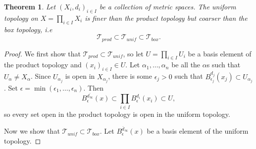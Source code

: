 \documentclass{article}
\newtheorem{theorem}{Theorem}[subsection]
\theoremstyle{definition}
\theoremstyle{remark}
\newcommand{\prt}[1]{\mathcal{#1}}
\newcommand{\ball}[3]{B_{#1}^{#3}(#2)}
\let\oldmin\min
\renewcommand{\min}[1]{\oldmin \left( #1 \right)}
\begin{document}
\begin{theorem} \label{thm_productUniformBoxCmp}
    Let $(X_i, d_i)_{i \in I}$ be a collection of metric spaces. The uniform topology on $X = \prod_{i \in I} X_i$ is finer than the product topology but coarser than the box topology, i.e
    \begin{equation*}
        \prt{T}_{prod} \subset \prt{T}_{unif} \subset \prt{T}_{box}.
    \end{equation*}
\end{theorem}

\begin{proof}
    We first show that $\prt{T}_{prod} \subset \prt{T}_{unif}$, so let $U=\prod_{i \in I} U_i$ be a basis element of the product topology and $(x_{i})_{i \in I} \in U$. Let $\alpha_1, \dots, \alpha_n$ be all the $\alpha$s such that $U_\alpha \neq X_\alpha$. Since $U_{\alpha_j}$ is open in $X_{\alpha_j}$, there is some $\epsilon_j > 0$ such that $B_{\epsilon_j}^{d_j}(x_j) \subset U_{\alpha_j}$. Set $\epsilon = \min{\epsilon_1, \dots, \epsilon_n}$. Then 
    \begin{equation*}
        B_{\epsilon}^{\overline{d_\infty}}(x) \subset \prod_{i \in I} B_{\epsilon}^{d_{i}}(x_i) \subset U,
    \end{equation*} so every set open in the product topology is open in the uniform topology.
    
    Now we show that $\prt{T}_{unif} \subset \prt{T}_{box}$. Let $\ball{\epsilon}{x}{\overline{d}_\infty}$ be a basis element of the uniform topology.
\end{proof}
\end{document}
